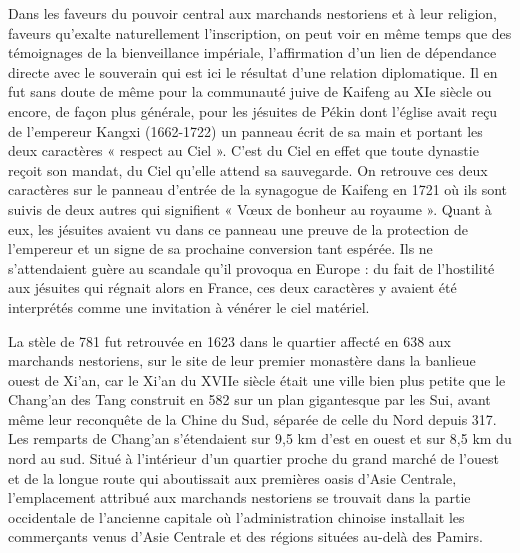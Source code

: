 Dans les faveurs du pouvoir central aux marchands nestoriens et à leur
religion, faveurs qu'exalte naturellement l'inscription, on peut voir
en même temps que des témoignages de la bienveillance impériale,
l'affirmation d'un lien de dépendance directe avec le souverain qui est
ici le résultat d'une relation diplomatique. Il en fut sans doute de
même pour la communauté juive de Kaifeng au XIe siècle ou encore, de
façon plus générale, pour les jésuites de Pékin dont l'église avait reçu
de l'empereur Kangxi (1662-1722) un panneau écrit de sa main et portant
les deux caractères « respect au Ciel ». C'est du Ciel en effet que
toute dynastie reçoit son mandat, du Ciel qu'elle attend sa sauvegarde.
On retrouve ces deux caractères sur le panneau d'entrée de la synagogue
de Kaifeng en 1721 où ils sont suivis de deux autres qui signifient «
Vœux de bonheur au royaume ». Quant à eux, les jésuites avaient vu dans
ce panneau une preuve de la protection de l'empereur et un signe de sa
prochaine conversion tant espérée. Ils ne s'attendaient guère au
scandale qu'il provoqua en Europe : du fait de l'hostilité aux jésuites
qui régnait alors en France, ces deux caractères y avaient été
interprétés comme une invitation à vénérer le ciel matériel.

La stèle de 781 fut retrouvée en 1623 dans le quartier affecté
en 638 aux marchands nestoriens, sur le site de leur premier monastère
dans la banlieue ouest de Xi'an, car le Xi'an du
XVIIe siècle était une ville bien plus petite que le Chang'an des Tang
construit en 582 sur un plan gigantesque par les Sui, avant même leur
reconquête de la Chine du Sud, séparée de celle du Nord depuis 317. Les
remparts de Chang'an s'étendaient sur 9,5 km d'est en ouest et sur 8,5
km du nord au sud. Situé à l'intérieur d'un quartier proche du grand
marché de l'ouest et de la longue route qui aboutissait aux premières
oasis d'Asie Centrale, l'emplacement attribué aux marchands nestoriens
se trouvait dans la partie occidentale de l'ancienne capitale où
l'administration chinoise installait les commerçants venus d'Asie
Centrale et des régions situées au-delà des Pamirs.

